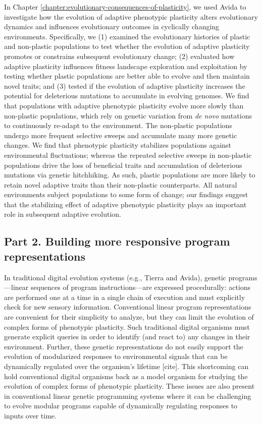 In Chapter \ref{chapter:evolutionary-consequences-of-plasticity}, we used Avida to investigate how the evolution of adaptive phenotypic plasticity alters evolutionary dynamics and influences evolutionary outcomes in cyclically changing environments.
Specifically, we 
(1) examined the evolutionary histories of plastic and non-plastic populations to test whether the evolution of adaptive plasticity promotes or constrains subsequent evolutionary change;
(2) evaluated how adaptive plasticity influences fitness landscape exploration and exploitation by testing whether plastic populations are better able to evolve and then maintain novel traits;
and (3) tested if the evolution of adaptive plasticity increases the potential for deleterious mutations to accumulate in evolving genomes.
We find that populations with adaptive phenotypic plasticity evolve more slowly than non-plastic populations, which rely on genetic variation from \textit{de novo} mutations to continuously re-adapt to the environment.
The non-plastic populations undergo more frequent selective sweeps and accumulate many more genetic changes. %
We find that phenotypic plasticity stabilizes populations against environmental fluctuations; whereas the repeated selective sweeps in non-plastic populations drive the loss of beneficial traits and accumulation of deleterious mutations via genetic hitchhiking.  
As such, plastic populations are more likely to retain novel adaptive traits than their non-plastic counterparts. 
All natural environments subject populations to some form of change; our findings suggest that the stabilizing effect of adaptive phenotypic plasticity plays an important role in subsequent adaptive evolution.

\subsection{Part 2. Building more responsive program representations}

In traditional digital evolution systems (e.g., Tierra and Avida), genetic programs---linear sequences of program instructions---are expressed procedurally: actions are performed one at a time in a single chain of execution and must explicitly check for new sensory information.
Conventional linear program representations are convenient for their simplicity to analyze, but they can limit the evolution of complex forms of phenotypic plasticity. 
Such traditional digital organisms must generate explicit queries in order to identify (and react to) any changes in their environment.
Further, these genetic representations do not easily support the evolution of modularized responses to environmental signals that can be dynamically regulated over the organism's lifetime [cite].
This shortcoming can hold conventional digital organisms back as a model organism for studying the evolution of complex forms of phenotypic plasticity.
These issues are also present in conventional linear genetic programming systems where it can be challenging to evolve modular programs capable of dynamically regulating responses to inputs over time. 


